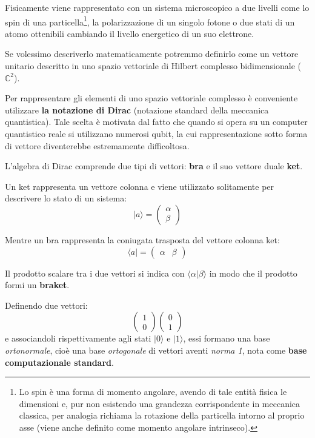 Fisicamente viene rappresentato con un sistema microscopico a due livelli come lo spin di una particella\footnote{Lo spin è una forma di momento angolare, avendo di tale entità fisica le dimensioni e, pur non esistendo una grandezza corrispondente in meccanica classica, per analogia richiama la rotazione della particella intorno al proprio asse (viene anche definito come momento angolare intrinseco).}, la polarizzazione di un singolo fotone o due stati di un atomo ottenibili cambiando il livello energetico di un suo elettrone.

Se volessimo descriverlo matematicamente potremmo definirlo come un vettore unitario descritto in uno spazio vettoriale di Hilbert complesso bidimensionale (\(\mathbb{C}^2\)).

Per rappresentare gli elementi di uno spazio vettoriale complesso è conveniente utilizzare \textbf{la notazione di Dirac} (notazione standard della meccanica quantistica). Tale scelta è motivata dal fatto che quando si opera su un computer quantistico reale si utilizzano numerosi qubit, la cui rappresentazione sotto forma di vettore diventerebbe estremamente difficoltosa.

L'algebra di Dirac comprende due tipi di vettori: \textbf{bra} e il suo vettore duale \textbf{ket}.

Un ket rappresenta un vettore colonna e viene utilizzato solitamente per descrivere lo stato di un sistema:
\[
  | a \rangle = \begin{pmatrix} \alpha \\ \beta \end{pmatrix}
\]

Mentre un bra rappresenta la coniugata trasposta del vettore colonna ket:
\[
  \langle a | = \begin{pmatrix} \alpha & \beta \end{pmatrix}
\]

Il prodotto scalare tra i due vettori si indica con \(\langle \alpha | \beta \rangle\) in modo che il prodotto formi un \textbf{braket}.

Definendo due vettori:
\[
  \begin{pmatrix} 1 \\ 0 \end{pmatrix}
  \begin{pmatrix} 0 \\ 1 \end{pmatrix}
\]
e associandoli rispettivamente agli stati \( | 0 \rangle\) e \( | 1 \rangle\), essi formano una base \textit{ortonormale}, cioè una base \textit{ortogonale} di vettori aventi \textit{norma 1}, nota come \textbf{base computazionale standard}.

